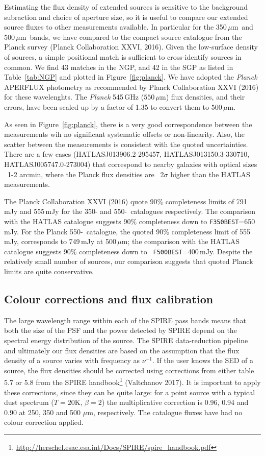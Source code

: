 \documentclass[a4paper,fleqn,usenatbib, twocolumn]{aastex61}
\def\mic{\,$\mu $m}
\begin{document}
Estimating the flux density of extended sources is sensitive to the
background subraction and choice of aperture size, so it is useful to
compare our extended source fluxes to other measurements available. In
particular for the 350\mic\ and 500\mic\ bands, we have compared to
the compact source catalogue from the Planck survey (Planck
Collaboration XXVI, 2016).  Given the low-surface density of sources,
a simple positional match is sufficient to cross-identify sources in
common. We find 43 matches in the NGP, and 42 in the SGP as listed in
Table~\ref{tab:NGP} and plotted in Figure~\ref{fig:planck}.  We have
adopted the \textit{Planck} APERFLUX photometry as recommended by
Planck Collaboration XXVI (2016) for these wavelenghts. The
\textit{Planck} 545\,GHz ($550\,\mu$m) flux densities, and their
errors, have been scaled up by a factor of 1.35 to convert them to
$500\,\mu$m.


As seen in Figure~\ref{fig:planck}, there is a very good
correspondence between the measurements wih no significant systematic
offsets or non-linearity. Also, the scatter between the measurements
is consistent with the quoted uncertainties. There are a few cases
(HATLASJ013906.2-295457, HATLASJ013150.3-330710,
HATLASJ005747.0-273004) that correspond to nearby galaxies with
optical sizes ~1-2 arcmin, where the Planck flux densities are
~2$\sigma$ higher than the HATLAS measurements.


The Planck Collaboration XXVI (2016) quote 90\% completeness limits of
791\,mJy and 555\,mJy for the 350- and 550-\micron\ catalogues
respectively. The comparison with the HATLAS catalogue suggests 90\%
completeness down to {\tt F350BEST}=650\,mJy.  For the Planck
550-\micron\ catalogue, the quoted 90\% completeness limit of
555\,mJy, corresponds to 749\,mJy at 500\mic; the comparison with the
HATLAS catalogue suggests 90\% completeness down to {\tt
  F500BEST}=400\,mJy.  Despite the relatively small number of sources,
our comparison suggests that quoted Planck limits are quite
conservative.


\subsection{Colour corrections and flux calibration}

The large wavelength range within each of the SPIRE pass bands means
that both the size of the PSF and the power detected by SPIRE depend
on the spectral energy distribution of the source.  The SPIRE
data-reduction pipeline and ultimately our flux densities are based on
the assumption that the flux density of a source varies with frequency
as $\nu^{-1}$.  If the user knows the SED of a source, the flux
densities should be corrected using corrections from either table 5.7
or 5.8 from the SPIRE
handbook\footnote{\url{http://herschel.esac.esa.int/Docs/SPIRE/spire\_handbook.pdf}}
(Valtchanov 2017). It is important to apply these corrections, since
they can be quite large: for a point source with a typical dust
spectrum ($T=20$K, $\beta=2$) the multiplicative correction is 0.96,
0.94 and 0.90 at 250, 350 and 500 $\mu$m, respectively. The catalogue
fluxes have had no colour correction applied.
\end{document}
